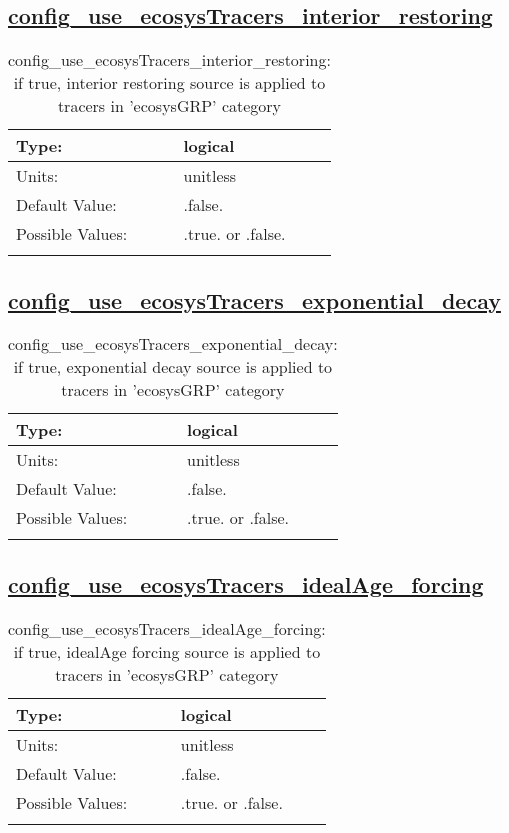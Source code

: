 \subsection[config\_use\_ecosysTracers\_interior\_restoring]{\hyperref[sec:nm_tab_tracer_forcing_ecosysTracers]{config\_use\_ecosysTracers\_interior\_restoring}}
\label{subsec:nm_sec_config_use_ecosysTracers_interior_restoring}
\begin{center}
\begin{longtable}{| p{2.0in} || p{4.0in} |}
    \hline
    Type: & logical \\
    \hline
    Units: & \si{unitless} \\
    \hline
    Default Value: & .false. \\
    \hline
    Possible Values: & .true. or .false. \\
    \hline
    \caption{config\_use\_ecosysTracers\_interior\_restoring: if true, interior restoring source is applied to tracers in 'ecosysGRP' category}
\end{longtable}
\end{center}
\subsection[config\_use\_ecosysTracers\_exponential\_decay]{\hyperref[sec:nm_tab_tracer_forcing_ecosysTracers]{config\_use\_ecosysTracers\_exponential\_decay}}
\label{subsec:nm_sec_config_use_ecosysTracers_exponential_decay}
\begin{center}
\begin{longtable}{| p{2.0in} || p{4.0in} |}
    \hline
    Type: & logical \\
    \hline
    Units: & \si{unitless} \\
    \hline
    Default Value: & .false. \\
    \hline
    Possible Values: & .true. or .false. \\
    \hline
    \caption{config\_use\_ecosysTracers\_exponential\_decay: if true, exponential decay source is applied to tracers in 'ecosysGRP' category}
\end{longtable}
\end{center}
\subsection[config\_use\_ecosysTracers\_idealAge\_forcing]{\hyperref[sec:nm_tab_tracer_forcing_ecosysTracers]{config\_use\_ecosysTracers\_idealAge\_forcing}}
\label{subsec:nm_sec_config_use_ecosysTracers_idealAge_forcing}
\begin{center}
\begin{longtable}{| p{2.0in} || p{4.0in} |}
    \hline
    Type: & logical \\
    \hline
    Units: & \si{unitless} \\
    \hline
    Default Value: & .false. \\
    \hline
    Possible Values: & .true. or .false. \\
    \hline
    \caption{config\_use\_ecosysTracers\_idealAge\_forcing: if true, idealAge forcing source is applied to tracers in 'ecosysGRP' category}
\end{longtable}
\end{center}
